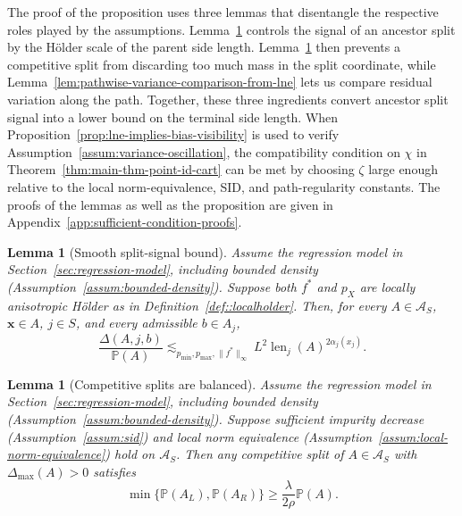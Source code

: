 \documentclass[11pt]{article}
\theoremstyle{plain}
\newtheorem{lemma}[theorem]{Lemma}
\theoremstyle{definition}
\theoremstyle{remark}
\theoremstyle{plain}
\newcommand{\bx}{\mathbf{x}}
\renewcommand{\P}{\mathbb{P}}
\DeclareMathOperator{\len}{len}
\newcommand{\1}{\mathbbm{1}}
\begin{document}
The proof of the proposition uses three lemmas that disentangle the respective roles played by the assumptions.
Lemma~\ref{lem:smooth-split-signal-upper} controls the signal of an ancestor split by the H\"older scale of the parent side length.
Lemma~\ref{lem:reliable-split-balance-from-lne} then prevents a competitive split from discarding too much mass in the split coordinate, while Lemma~\ref{lem:pathwise-variance-comparison-from-lne} lets us compare residual variation along the path.
Together, these three ingredients convert ancestor split signal into a lower bound on the terminal side length.
When Proposition~\ref{prop:lne-implies-bias-visibility} is used to verify Assumption~\ref{assum:variance-oscillation}, the compatibility condition on $\chi$ in Theorem~\ref{thm:main-thm-point-id-cart} can be met by choosing $\zeta$ large enough relative to the local norm-equivalence, SID, and path-regularity constants.
The proofs of the lemmas as well as the proposition are given in Appendix~\ref{app:sufficient-condition-proofs}.

\begin{lemma}[Smooth split-signal bound]
\label{lem:smooth-split-signal-upper}
Assume the regression model in Section~\ref{sec:regression-model}, including bounded density (Assumption~\ref{assum:bounded-density}). 
Suppose both $f^*$ and $p_X$ are locally anisotropic H\"older as in Definition~\ref{def::localholder}. Then, for every $A\in\mathcal A_S$, $\bx\in A$, $j\in S$, and every admissible $b\in A_j$,
\begin{equation}
\label{eq:directional-split-smoothness}
\frac{\Delta(A,j,b)}{\P(A)}
\lesssim_{p_{\min},p_{\max},\|f^*\|_\infty}
L^2\len_j(A)^{2\alpha_j(x_j)}.
\end{equation}
\end{lemma}



\begin{lemma}[Competitive splits are balanced]
\label{lem:reliable-split-balance-from-lne}
Assume the regression model in Section~\ref{sec:regression-model}, including bounded density (Assumption~\ref{assum:bounded-density}).
Suppose sufficient impurity decrease (Assumption~\ref{assum:sid}) and local norm equivalence (Assumption~\ref{assum:local-norm-equivalence}) hold on $\mathcal A_S$.
Then any competitive split of $A\in\mathcal A_S$ with $\Delta_{\max}(A)>0$ satisfies
\[
\min\{\P(A_L), \P(A_R)\}
\ge
\frac{\lambda}{2\rho}\P(A).
\]
\end{lemma}
\end{document}
